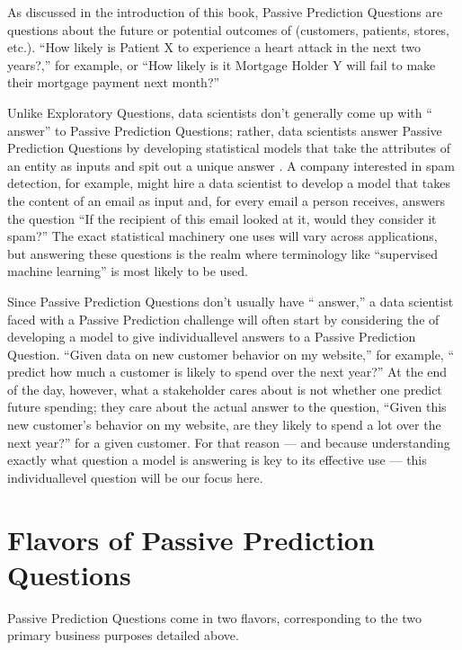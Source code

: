 \documentclass[letterpaper,10pt,english]{jupyterBook}
\begin{document}
\sphinxAtStartPar
As discussed in the introduction of this book, Passive Prediction Questions are questions about the future or potential outcomes of  (customers, patients, stores, etc.). “How likely is Patient X to experience a heart attack in the next two years?,” for example, or “How likely is it Mortgage Holder Y will fail to make their mortgage payment next month?”

\sphinxAtStartPar
Unlike Exploratory Questions, data scientists don’t generally come up with “ answer” to Passive Prediction Questions; rather, data scientists answer Passive Prediction Questions by developing statistical models that take the attributes of an entity as inputs and spit out a unique answer . A company interested in spam detection, for example, might hire a data scientist to develop a model that takes the content of an email as input and, for every email a person receives, answers the question “If the recipient of this email looked at it, would they consider it spam?” The exact statistical machinery one uses will vary across applications, but answering these questions is the realm where terminology like “supervised machine learning” is most likely to be used.

\sphinxAtStartPar
Since Passive Prediction Questions don’t usually have “ answer,” a data scientist faced with a Passive Prediction challenge will often start by considering the  of developing a model to give individual\sphinxhyphen{}level answers to a Passive Prediction Question. “Given data on new customer behavior on my website,” for example, “ predict how much a customer is likely to spend over the next year?” At the end of the day, however, what a stakeholder cares about is not whether one  predict future spending; they care about the actual answer to the question, “Given this new customer’s behavior on my website, are they likely to spend a lot over the next year?” for a given customer. For that reason — and because understanding exactly what question a model is answering is key to its effective use — this individual\sphinxhyphen{}level question will be our focus here.


\section{Flavors of Passive Prediction Questions}
\label{\detokenize{30_questions/20_using_passive_prediction_questions:flavors-of-passive-prediction-questions}}
\sphinxAtStartPar
Passive Prediction Questions come in two flavors, corresponding to the two primary business purposes detailed above.
\end{document}
